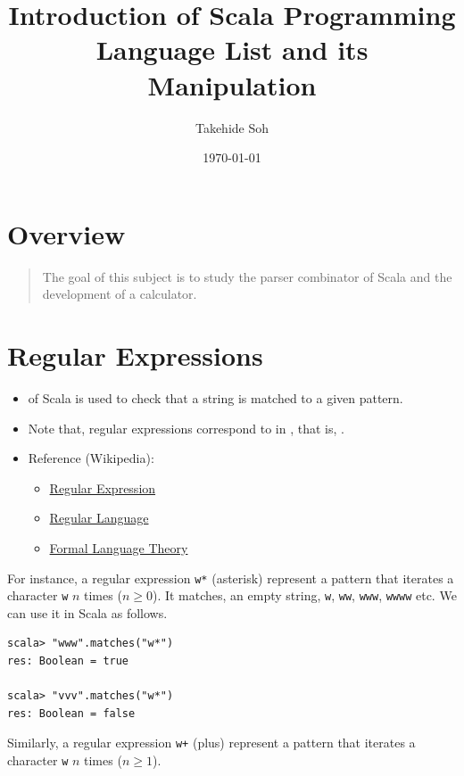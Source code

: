 \documentclass[11pt]{article}
\author{Takehide Soh}
\date{\today}
\title{Introduction of Scala Programming Language  List and its Manipulation}
\begin{document}
\maketitle
\setcounter{tocdepth}{1}
\tableofcontents


\section{Overview}
\label{sec:orgheadline1}
\begin{quote}
The goal of this subject is to study the parser combinator of Scala
and the development of a calculator. 
\end{quote}

\section{Regular Expressions}
\label{sec:orgheadline3}
\begin{itemize}
\item of Scala is used to check that a
string is matched to a given pattern.
\item Note that, regular expressions correspond to  in
, that is, .

\item Reference (Wikipedia):
\begin{itemize}
\item \href{https://en.wikipedia.org/wiki/Regular_expression}{Regular Expression}
\item \href{https://en.wikipedia.org/wiki/Regular_language}{Regular Language}
\item \href{https://en.wikipedia.org/wiki/Formal_language}{Formal Language Theory}
\end{itemize}
\end{itemize}

For instance, a regular expression \texttt{w*} (asterisk) represent a pattern that 
iterates a character \texttt{w} \(n\) times (\(n \ge 0\)). It matches, an empty string, \texttt{w}, \texttt{ww}, \texttt{www}, \texttt{wwww} etc. 
We can use it in Scala as follows. 

\begin{verbatim}
scala> "www".matches("w*")
res: Boolean = true

scala> "vvv".matches("w*")
res: Boolean = false
\end{verbatim}

Similarly, a regular expression \texttt{w+} (plus) represent a pattern that 
iterates a character \texttt{w} \(n\) times (\(n \ge 1\)). 
\end{document}
